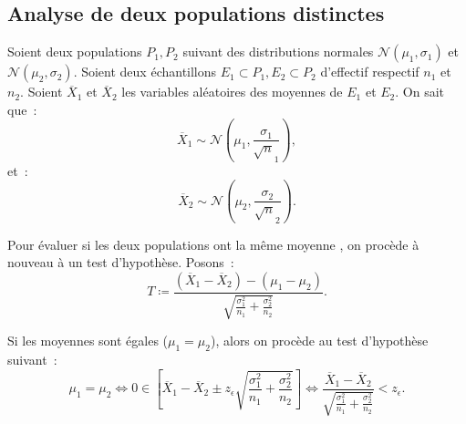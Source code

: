 \documentclass{article}
\begin{document}
	\subsection{Analyse de deux populations distinctes}
		Soient deux populations $P_1, P_2$ suivant des distributions normales $\mathcal N(\mu_1, \sigma_1)$ et $\mathcal N(\mu_2, \sigma_2)$. Soient deux échantillons
		$E_1 \subset P_1, E_2 \subset P_2$ d'effectif respectif $n_1$ et $n_2$. Soient $\overline X_1$ et $\overline X_2$ les variables aléatoires des moyennes de
		$E_1$ et $E_2$. On sait que~:
		\[\overline X_1 \sim \mathcal N\left(\mu_1, \frac {\sigma_1}{\sqrt n_1}\right),\]
		et~:
		\[\overline X_2 \sim \mathcal N\left(\mu_2, \frac {\sigma_2}{\sqrt n_2}\right).\]

		Pour évaluer si les deux populations ont la même moyenne , on procède à nouveau à un test d'hypothèse. Posons~:
		\[T \coloneqq \frac {(\overline X_1 - \overline X_2) - (\mu_1 - \mu_2)}{\sqrt {\frac {\sigma_1^2}{n_1} + \frac {\sigma_2^2}{n_2}}}.\]

		Si les moyennes sont égales ($\mu_1 = \mu_2$), alors on procède au test d'hypothèse suivant~:
		\[\mu_1 = \mu_2 \iff 0 \in \left[\overline X_1 - \overline X_2 \pm z_\epsilon\sqrt {\frac {\sigma_1^2}{n_1} + \frac {\sigma_2^2}{n_2}}\right]
			\iff \frac {\overline X_1 - \overline X_2}{\sqrt {\frac {\sigma_1^2}{n_1} + \frac {\sigma_2^2}{n_2}}} < z_\epsilon.\]
\end{document}
